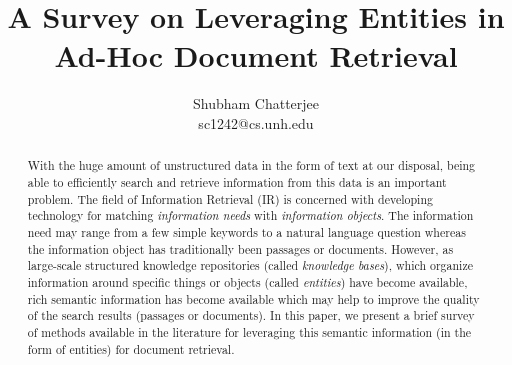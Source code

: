 \documentclass{article}
\title{ A Survey on Leveraging Entities in Ad-Hoc Document Retrieval}
\author{
Shubham Chatterjee \\ sc1242@cs.unh.edu
}
\begin{document}
\maketitle

\begin{abstract}
With the huge amount of unstructured data in the form of text at our disposal, being able to efficiently search and retrieve information from this data is an important problem. The field of Information Retrieval (IR) is concerned with developing technology for matching \textit{information needs} with \textit{information objects}\cite{balog2018entity}. The information need may range from a few simple keywords to a natural language question whereas the information object has traditionally been passages or documents. However, as large-scale structured knowledge repositories (called \textit{knowledge bases}), which organize information around specific things or objects (called \textit{entities}) have become available, rich semantic information has become available which may help to improve the quality of the search results (passages or documents). In this paper, we present a brief survey of methods available in the literature for leveraging this semantic information (in the form of entities) for document retrieval.  


\end{abstract}
\vskip 32pt
\end{document}
